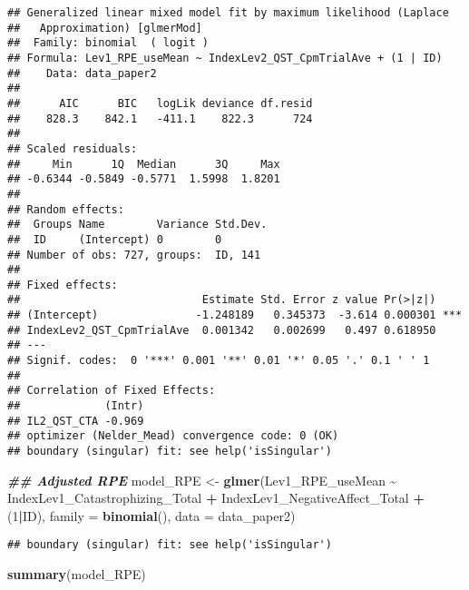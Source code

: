 \documentclass[
  12pt,
]{article}
\newenvironment{Shaded}{\begin{snugshade}}{\end{snugshade}}
\newcommand{\AttributeTok}[1]{\textcolor[rgb]{0.13,0.29,0.53}{#1}}
\newcommand{\DecValTok}[1]{\textcolor[rgb]{0.00,0.00,0.81}{#1}}
\newcommand{\DocumentationTok}[1]{\textcolor[rgb]{0.56,0.35,0.01}{\textbf{\textit{#1}}}}
\newcommand{\FunctionTok}[1]{\textcolor[rgb]{0.13,0.29,0.53}{\textbf{#1}}}
\newcommand{\NormalTok}[1]{#1}
\newcommand{\OtherTok}[1]{\textcolor[rgb]{0.56,0.35,0.01}{#1}}
\newcommand{\SpecialCharTok}[1]{\textcolor[rgb]{0.81,0.36,0.00}{\textbf{#1}}}
\begin{document}
\begin{verbatim}
## Generalized linear mixed model fit by maximum likelihood (Laplace
##   Approximation) [glmerMod]
##  Family: binomial  ( logit )
## Formula: Lev1_RPE_useMean ~ IndexLev2_QST_CpmTrialAve + (1 | ID)
##    Data: data_paper2
## 
##      AIC      BIC   logLik deviance df.resid 
##    828.3    842.1   -411.1    822.3      724 
## 
## Scaled residuals: 
##     Min      1Q  Median      3Q     Max 
## -0.6344 -0.5849 -0.5771  1.5998  1.8201 
## 
## Random effects:
##  Groups Name        Variance Std.Dev.
##  ID     (Intercept) 0        0       
## Number of obs: 727, groups:  ID, 141
## 
## Fixed effects:
##                            Estimate Std. Error z value Pr(>|z|)    
## (Intercept)               -1.248189   0.345373  -3.614 0.000301 ***
## IndexLev2_QST_CpmTrialAve  0.001342   0.002699   0.497 0.618950    
## ---
## Signif. codes:  0 '***' 0.001 '**' 0.01 '*' 0.05 '.' 0.1 ' ' 1
## 
## Correlation of Fixed Effects:
##             (Intr)
## IL2_QST_CTA -0.969
## optimizer (Nelder_Mead) convergence code: 0 (OK)
## boundary (singular) fit: see help('isSingular')
\end{verbatim}

\begin{Shaded}
\begin{Highlighting}[]
\DocumentationTok{\#\# Adjusted RPE}
\NormalTok{model\_RPE }\OtherTok{\textless{}{-}} \FunctionTok{glmer}\NormalTok{(Lev1\_RPE\_useMean }\SpecialCharTok{\textasciitilde{}}\NormalTok{  IndexLev1\_Catastrophizing\_Total }\SpecialCharTok{+}\NormalTok{ IndexLev1\_NegativeAffect\_Total }\SpecialCharTok{+}\NormalTok{ (}\DecValTok{1}\SpecialCharTok{|}\NormalTok{ID), }\AttributeTok{family =} \FunctionTok{binomial}\NormalTok{(), }\AttributeTok{data =}\NormalTok{ data\_paper2)}
\end{Highlighting}
\end{Shaded}

\begin{verbatim}
## boundary (singular) fit: see help('isSingular')
\end{verbatim}

\begin{Shaded}
\begin{Highlighting}[]
\FunctionTok{summary}\NormalTok{(model\_RPE)}
\end{Highlighting}
\end{Shaded}
\end{document}

